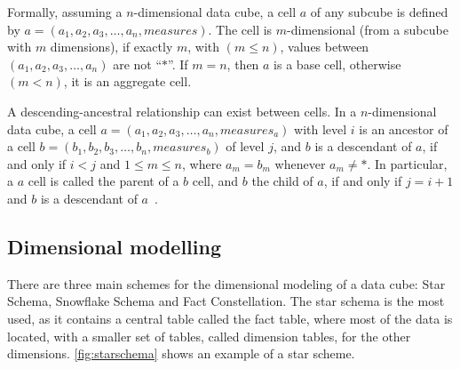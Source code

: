 Formally, assuming a $n$-dimensional data cube, a cell $a$ of any subcube is defined by $a = (a_1, a_2, a_3, \ldots, a_n, measures)$.
The cell is $m$-dimensional (from a subcube with $m$ dimensions), if exactly $m$, with $(m \leq n)$, values between $(a_1, a_2, a_3, \ldots, a_n)$ are not ``$*$''.
If $m = n$, then $a$ is a base cell, otherwise $(m < n)$, it is an aggregate cell.

A descending-ancestral relationship can exist between cells.
In a $n$-dimensional data cube, a cell $a = (a_1, a_2, a_3, \ldots, a_n, measures_a)$ with level $i$ is an ancestor of a cell $b = (b_1, b_2, b_3, \ldots, b_n, measures_b)$ of level $j$, and $b$ is a descendant of $a$, if and only if $i < j$ and $1 \leq m \leq n$, where $a_m = b_m$ whenever $a_m \neq *$.
In particular, a $a$ cell is called the parent of a $b$ cell, and $b$ the child of $a$, if and only if $j = i+1$ and $b$ is a descendant of $a$~\cite{hanDataMiningConcepts2011}.

\subsection{Dimensional modelling}\label{ch:fun:cube:dimm}

There are three main schemes for the dimensional modeling of a data cube: Star Schema, Snowflake Schema and Fact Constellation.
The star schema is the most used, as it contains a central table called the fact table, where most of the data is located, with a smaller set of tables, called dimension tables, for the other dimensions.
\autoref{fig:starschema} shows an example of a star scheme.

